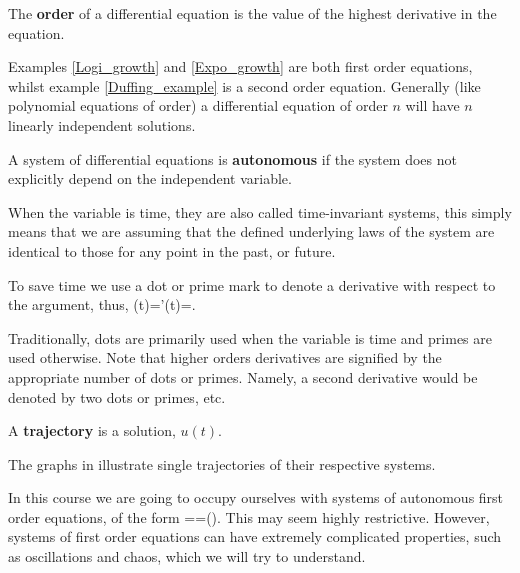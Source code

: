 \begin{defin}
The \textbf{order} of a differential equation is the value of the highest derivative in the equation.
\end{defin}
Examples \ref{Logi_growth} and \ref{Expo_growth} are both first order equations, whilst example \ref{Duffing_example} is a second order equation. Generally (like polynomial equations of order) a differential equation of order $n$ will have $n$ linearly independent solutions.

\begin{defin}
A system of differential equations is \textbf{autonomous} if the system does not explicitly depend on the independent variable.
\end{defin}
When the variable is time, they are also called time-invariant systems, this simply means that we are assuming that the defined underlying laws of the system are identical to those for any point in the past, or future.

\begin{defin}
To save time we use a dot or prime mark to denote a derivative with respect to the argument, thus,
\bb
{}(t)='(t)=.
\ee
\end{defin}
Traditionally, dots are primarily used when the variable is time and primes are used otherwise. Note that higher orders derivatives are signified by the appropriate number of dots or primes. Namely, a second derivative would be denoted by two dots or primes, etc.

\begin{defin}
A \textbf{trajectory} is a solution, $u(t)$.
\end{defin}
The graphs in  illustrate single trajectories of their respective systems.



In this course we are going to occupy ourselves with systems of autonomous first order equations, of the form
\bb
{}==().\label{ODE}
\ee
This may seem highly restrictive. However, systems of first order equations can have extremely complicated properties, such as oscillations and chaos, which we will try to understand.

